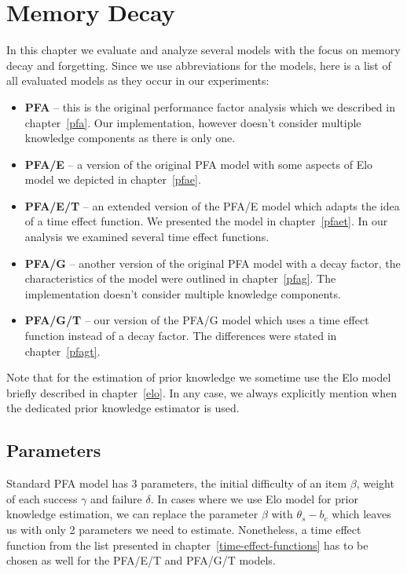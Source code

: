 \section{Memory Decay}

In this chapter we evaluate and analyze several models with the focus on memory decay and forgetting. Since we use abbreviations for the models, here is a list of all evaluated models as they occur in our experiments:

\begin{itemize}
  \item \textbf{PFA} -- this is the original performance factor analysis which we described in chapter~\ref{pfa}. Our implementation, however doesn't consider multiple knowledge components as there is only one.
  \item \textbf{PFA/E} -- a version of the original PFA model with some aspects of Elo model we depicted in chapter~\ref{pfae}.
  \item \textbf{PFA/E/T} -- an extended version of the PFA/E model which adapts the idea of a time effect function. We presented the model in chapter~\ref{pfaet}. In our analysis we examined several time effect functions.
  \item \textbf{PFA/G} -- another version of the original PFA model with a decay factor, the characteristics of the model were outlined in chapter~\ref{pfag}. The implementation doesn't consider multiple knowledge components.
  \item \textbf{PFA/G/T} -- our version of the PFA/G model which uses a time effect function instead of a decay factor. The differences were stated in chapter~\ref{pfagt}.
\end{itemize}

Note that for the estimation of prior knowledge we sometime use the Elo model briefly described in chapter~\ref{elo}. In any case, we always explicitly mention when the dedicated prior knowledge estimator is used.

\subsection{Parameters}
\label{parameters}

Standard PFA model has 3 parameters, the initial difficulty of an item $\beta$, weight of each success $\gamma$ and failure $\delta$. In cases where we use Elo model for prior knowledge estimation, we can replace the parameter $\beta$ with $\theta_s - b_c$ which leaves us with only 2 parameters we need to estimate. Nonetheless, a time effect function from the list presented in chapter~\ref{time-effect-functions} has to be chosen as well for the PFA/E/T and PFA/G/T models.

